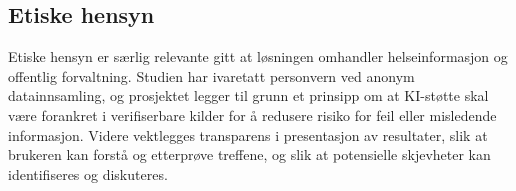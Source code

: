 \subsection{Etiske hensyn}
\label{sec:etikk}

Etiske hensyn er særlig relevante gitt at løsningen omhandler helseinformasjon og offentlig forvaltning. Studien har ivaretatt personvern ved anonym datainnsamling, og prosjektet legger til grunn et prinsipp om at KI-støtte skal være forankret i verifiserbare kilder for å redusere risiko for feil eller misledende informasjon. Videre vektlegges transparens i presentasjon av resultater, slik at brukeren kan forstå og etterprøve treffene, og slik at potensielle skjevheter kan identifiseres og diskuteres.

